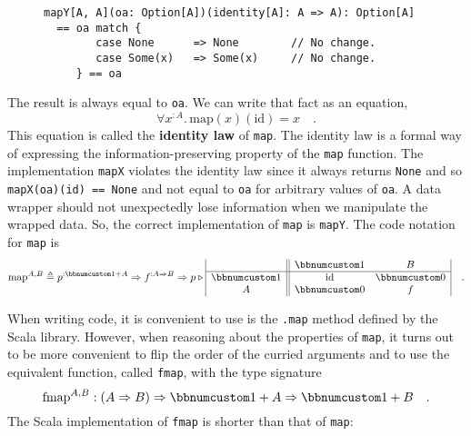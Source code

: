 \begin{wrapfigure}{l}{0.65\columnwidth}%
\vspace{-0.8\baselineskip}
\begin{lstlisting}
mapY[A, A](oa: Option[A])(identity[A]: A => A): Option[A]
  == oa match {
        case None      => None        // No change.
        case Some(x)   => Some(x)     // No change.
     } == oa
\end{lstlisting}
\vspace{-1.3\baselineskip}
\end{wrapfigure}%
The result is always equal to \lstinline!oa!. We can write that fact
as an equation,
\[
\forall x^{:A}.\,\text{map}(x)(\text{id})=x\quad.
\]
This equation is called the \textbf{identity law}
of \lstinline!map!. The identity law is a formal way of expressing
the information-preserving property of the \lstinline!map! function.
The implementation \lstinline!mapX! violates the identity law since
it always returns \lstinline!None! and so \lstinline!mapX(oa)(id) == None!
and not equal to \lstinline!oa! for arbitrary values of \lstinline!oa!.
A data wrapper should not unexpectedly lose information when we manipulate
the wrapped data. So, the correct implementation of \lstinline!map!
is \lstinline!mapY!. The code notation for \lstinline!map! is
\[
\text{map}^{A,B}\triangleq p^{:\bbnum 1+A}\Rightarrow f^{:A\Rightarrow B}\Rightarrow p\triangleright\begin{array}{|c||cc|}
 & \bbnum 1 & B\\
\hline \bbnum 1 & \text{id} & \bbnum 0\\
A & \bbnum 0 & f
\end{array}\quad.
\]

When writing code, it is convenient to use is the \lstinline!.map!
method defined by the Scala library. However, when reasoning about
the properties of \lstinline!map!, it turns out to be more convenient
to flip the order of the curried arguments and to use the equivalent
function, called \lstinline!fmap!, with the type signature
\[
\text{fmap}^{A,B}:\left(A\Rightarrow B\right)\Rightarrow\bbnum 1+A\Rightarrow\bbnum 1+B\quad.
\]
The Scala implementation of \lstinline!fmap! is shorter than that
of \lstinline!map!:

